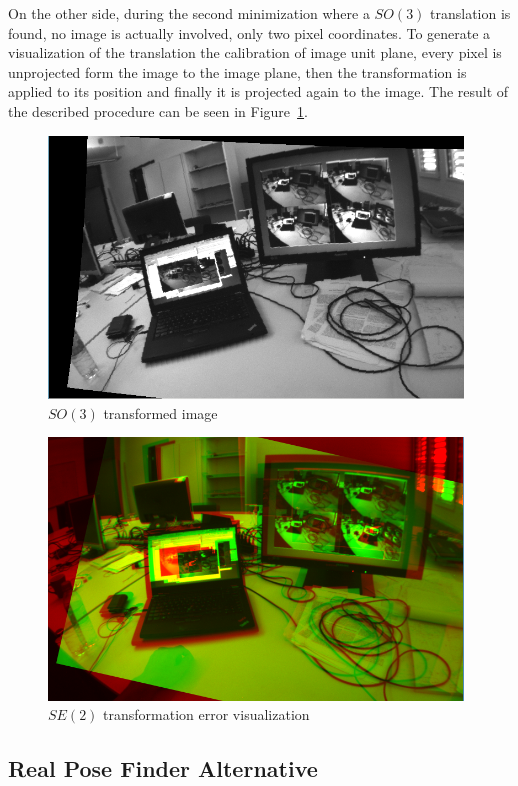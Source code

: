 On the other side, during the second minimization where a $SO(3)$ translation is found, no image is actually involved, only two pixel coordinates. To generate a visualization of the translation the calibration of image unit plane, every pixel is unprojected form the image to the image plane, then the transformation is applied to its position and finally it is projected again to the image. The result of the described procedure can be seen in Figure~\ref{fig:so3_transformation_1}.\\

\begin{figure}[htpb]
  \centering
  \includegraphics[width=11cm]{img/so3_transformation_1.png}
  \caption{$SO(3)$ transformed image}
  \label{fig:so3_transformation_1}
\end{figure}

\begin{figure}[htpb]
  \centering
  \includegraphics[width=11cm]{img/se2_error_1.png}
  \caption{$SE(2)$ transformation error visualization}
  \label{fig:se3_error_1}
\end{figure}


\subsection{Real Pose Finder Alternative}
\label{sub:real_pose_finder_alternative}

